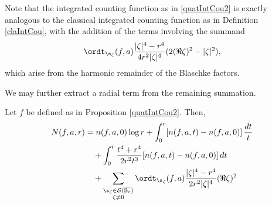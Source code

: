 \documentclass{amsart}
\begin{document}
\begin{remark}
    Note that the integrated counting function as in \ref{quatIntCou2} is exactly analogous to the classical integrated counting function as in Definition \ref{claIntCou}, with the addition of the terms involving the summand \[\ordt_{\s_\zeta}(f,a)\frac{|\zeta|^4-r^4}{4r^2|\zeta|^4}(2(\Re \zeta)^2-|\zeta|^2),\] which arise from the harmonic remainder of the Blaschke factors. 
\end{remark}

We may further extract a radial term from the remaining summation. 

\begin{prop}\label{quaIntCou3}
    Let $f$ be defined as in Proposition \ref{quatIntCou2}. Then, \begin{align*}
        N(f,a,r) &= n(f,a,0)\log r + \int_0^r[n(f,a,t)-n(f,a,0)]\,\frac{dt}{t} \\
        &\quad +  \int_0^r\frac{t^4+r^4}{2r^2t^3}[n(f,a,t)-n(f,a,0)]\,dt \\ 
        &\quad + \sum_{\substack{ \s_\zeta\in\mathcal{S}(\overline{\mathbb B_r}) \\ \zeta\neq 0}}
        \ordt_{\s_\zeta}(f,a) \frac{|\zeta|^4-r^4}{2r^2|\zeta|^4}(\Re \zeta)^2
    \end{align*}
\end{prop}
\end{document}
